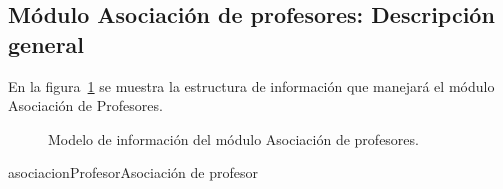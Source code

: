 
\subsection{Módulo Asociación de profesores: Descripción general}
En la figura~\ref{fig:asociacionProfesores} se muestra la estructura de información que manejará el módulo Asociación de Profesores.

\begin{figure}[htbp!]
	\begin{center}
		\caption{Modelo de información del módulo Asociación de profesores.}
		\label{fig:asociacionProfesores}
	\end{center}
\end{figure}

\begin{BusinessEntity}{asociacionProfesor}{Asociación de profesor}
	
	
	
\end{BusinessEntity}

